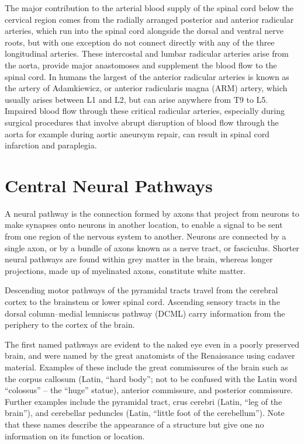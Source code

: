The major contribution to the arterial blood supply of the spinal cord below the cervical region comes from the radially arranged posterior and anterior radicular arteries, which run into the spinal cord alongside the dorsal and ventral nerve roots, but with one exception do not connect directly with any of the three longitudinal arteries. These intercostal and lumbar radicular arteries arise from the aorta, provide major anastomoses and supplement the blood flow to the spinal cord. In humans the largest of the anterior radicular arteries is known as the artery of Adamkiewicz, or anterior radicularis magna (ARM) artery, which usually arises between L1 and L2, but can arise anywhere from T9 to L5. Impaired blood flow through these critical radicular arteries, especially during surgical procedures that involve abrupt disruption of blood flow through the aorta for example during aortic aneursym repair, can result in spinal cord infarction and paraplegia.

\hypertarget{central-neural-pathways}{%
\section{Central Neural Pathways}\label{central-neural-pathways}}

A neural pathway is the connection formed by axons that project from neurons to make synapses onto neurons in another location, to enable a signal to be sent from one region of the nervous system to another. Neurons are connected by a single axon, or by a bundle of axons known as a nerve tract, or fasciculus. Shorter neural pathways are found within grey matter in the brain, whereas longer projections, made up of myelinated axons, constitute white matter.

Descending motor pathways of the pyramidal tracts travel from the cerebral cortex to the brainstem or lower spinal cord. Ascending sensory tracts in the dorsal column--medial lemniscus pathway (DCML) carry information from the periphery to the cortex of the brain.

The first named pathways are evident to the naked eye even in a poorly preserved brain, and were named by the great anatomists of the Renaissance using cadaver material. Examples of these include the great commissures of the brain such as the corpus callosum (Latin, ``hard body''; not to be confused with the Latin word ``colossus'' -- the ``huge'' statue), anterior commissure, and posterior commissure. Further examples include the pyramidal tract, crus cerebri (Latin, ``leg of the brain''), and cerebellar peduncles (Latin, ``little foot of the cerebellum''). Note that these names describe the appearance of a structure but give one no information on its function or location.

